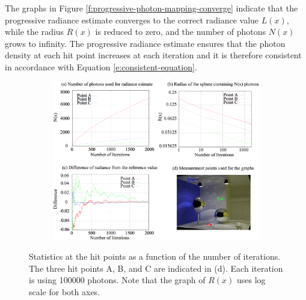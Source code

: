 The graphs in Figure \ref{f:progressive-photon-mapping-converge} indicate that the progressive radiance estimate converges to the correct radiance value $L(x)$, while the radius $R(x)$ is reduced to zero, and the number of photons $N(x)$ grows to infinity. The progressive radiance estimate ensures that the photon density at each hit point increases at each iteration and it is therefore consistent in accordance with Equation \ref{e:consistent-equation}.

\begin{figure}\label{f:progressive-photon-mapping-converge}
\begin{center}
	\begin{subfigure}[b]{1.\textwidth}
		\includegraphics[width=1.0\textwidth]{graphics/pm/pm-20}
	\end{subfigure}
\end{center}
\caption{Statistics at the hit points as a function of the number of iterations. The three hit points A, B, and C are indicated in (d). Each iteration is using 100000 photons. Note that the graph of $R(x)$ uses log scale for both axes.}
\end{figure}





